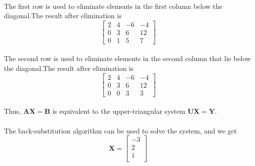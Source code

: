 \documentclass{article}  %
\begin{document}
        \paragraph{}The first row is used to eliminate elements in the first column below the diagonal.The result after elimination is
        \begin{equation*}       %
            \left[                 %
              \begin{array}{rrr|r}   %
                2 & 4 & -6 & -4 \\  %
                0 & 3 & 6 & 12 \\  %
                0 & 1 & 5 & 7
              \end{array}
            \right]                 %
        \end{equation*}
        \paragraph{}The second row is used to eliminate elements in the second column that lie below the
        diagonal.The result after elimination is
        \begin{equation*}       %
            \left[                 %
              \begin{array}{rrr|r}   %
                2 & 4 & -6 & -4 \\  %
                0 & 3 & 6 & 12 \\  %
                0 & 0 & 3 & 3
              \end{array}
            \right]                 %
        \end{equation*}
        \paragraph{}Thus, $\bm{AX = B}$ is equivalent to the upper-triangular system $\bm{UX = Y}$.
        \paragraph{}The back-substitution algorithm can be used to solve the system, and we get
        \begin{equation*}       %
            \bm{X=}  \left[                 %
              \begin{array}{r}   %
                -3 \\ %
                2 \\  %
                1 \\ 
              \end{array}
            \right]                 %
        \end{equation*}
\end{document}
